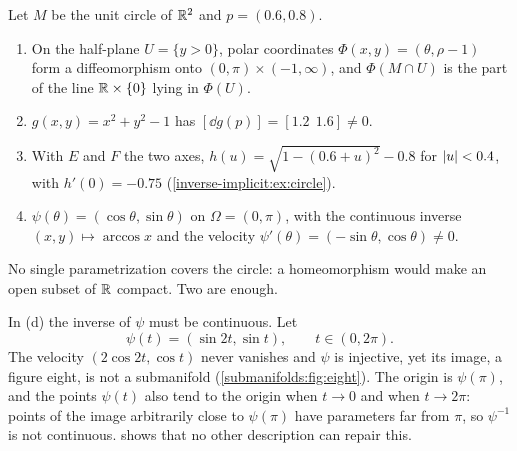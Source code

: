 \begin{notechapter}
\begin{example}\label{submanifolds:ex:circle}
Let $M$ be the unit circle of $\mathbb{R}^2$ and $p = (0.6, 0.8)$.
\begin{enumerate}[nosep,label=(\alph*)]
  \item On the half-plane $U = \{y > 0\}$, polar coordinates
        $\Phi(x, y) = (\theta, \rho - 1)$ form a diffeomorphism onto
        $(0, \pi)\times(-1, \infty)$, and $\Phi(M\cap U)$ is the part of
        the line $\mathbb{R}\times\{0\}$ lying in $\Phi(U)$.
  \item $g(x, y) = x^2 + y^2 - 1$ has $[\dd g(p)] = [1.2\ \ 1.6]\neq0$.
  \item With $E$ and $F$ the two axes, $h(u) = \sqrt{1 - (0.6 + u)^2} - 0.8$
        for $\left|u\right| < 0.4$, with $h'(0) = -0.75$
        (\cref{inverse-implicit:ex:circle}).
  \item $\psi(\theta) = (\cos\theta, \sin\theta)$ on $\Omega = (0, \pi)$,
        with the continuous inverse $(x, y)\mapsto\arccos x$ and the
        velocity $\psi'(\theta) = (-\sin\theta, \cos\theta)\neq0$.
\end{enumerate}
No single parametrization covers the circle: a homeomorphism would make
an open subset of $\mathbb{R}$ compact. Two are enough.
\end{example}

\begin{pitfall}
In (d) the inverse of $\psi$ must be continuous. Let
\[
  \psi(t) = (\sin2t, \sin t), \qquad t\in(0, 2\pi) .
\]
The velocity $(2\cos2t, \cos t)$ never vanishes and $\psi$ is injective,
yet its image, a figure eight, is not a submanifold
(\cref{submanifolds:fig:eight}). The origin is $\psi(\pi)$, and the points
$\psi(t)$ also tend to the origin when $t\to0$ and when $t\to2\pi$: points
of the image arbitrarily close to $\psi(\pi)$ have parameters far from
$\pi$, so $\psi^{-1}$ is not continuous.  shows
that no other description can repair this.
\end{pitfall}


\end{notechapter}
